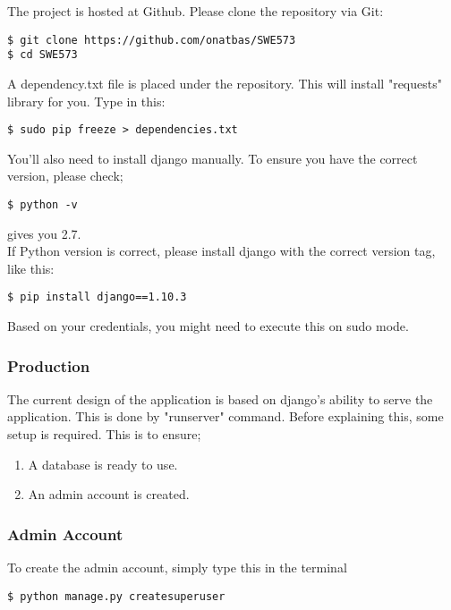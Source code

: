The project is hosted at Github. Please clone the repository via Git:

\begin{lstlisting}
$ git clone https://github.com/onatbas/SWE573
$ cd SWE573
\end{lstlisting}

A dependency.txt file is placed under the repository. This will install
"requests" library for you. Type in this:

\begin{lstlisting}
$ sudo pip freeze > dependencies.txt
\end{lstlisting}

You'll also need to install django manually. To ensure you have the correct
version, please check;

\begin{lstlisting}
$ python -v 
\end{lstlisting}
 gives you 2.7. \\ If Python version is correct, please install django with 
the correct version tag, like this:

\begin{lstlisting}
$ pip install django==1.10.3
\end{lstlisting}

Based on your credentials, you might need to execute this on sudo mode.

\subsubsection{Production}

The current design of the application is based on django's ability to serve
the application. This is done by "runserver" command. Before explaining this,
some setup is required. This is to ensure;
\begin{enumerate}
\item A database is ready to use.
\item An admin account is created.
\end{enumerate}

\subsubsection{Admin Account}
To create the admin account, simply type this in the terminal

\begin{lstlisting}
$ python manage.py createsuperuser
\end{lstlisting}

